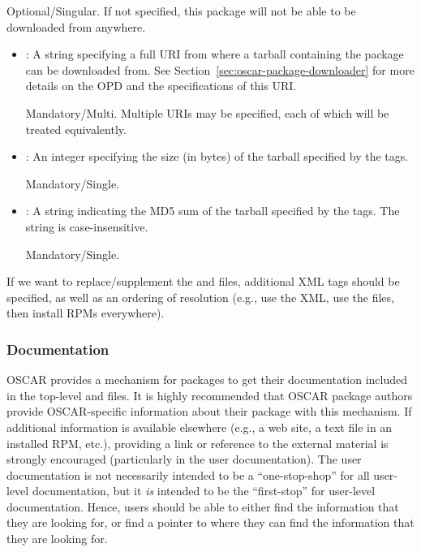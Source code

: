 \begin{itemize}
  Optional/Singular.  If not specified, this package will not be able
  to be downloaded from anywhere. 

  \begin{itemize}
  \item {}: A string specifying a full URI from where a
    tarball containing the package can be downloaded from.  See
    Section~\ref{sec:oscar-package-downloader} for more details on the
    OPD and the specifications of this URI.

    Mandatory/Multi.  Multiple URIs may be specified, each of which
    will be treated equivalently.  
    
  \item {}: An integer specifying the size (in bytes) of
    the tarball specified by the  tags.

    Mandatory/Single.
    
  \item {}: A string indicating the MD5 sum of the
    tarball specified by the  tags.  The string is
    case-insensitive. 
    
    Mandatory/Single.
  \end{itemize}
\end{itemize}

\begin{discuss}
  If we want to replace/supplement the  and
   files, additional XML tags should be
  specified, as well as an ordering of resolution (e.g., use the XML,
  use the files, then install RPMs everywhere).
\end{discuss}

\endchange


\subsubsection{Documentation}
\label{sec:design-pkg-docs}

OSCAR provides a mechanism for packages to get their documentation
included in the top-level  and 
files.  It is highly recommended that OSCAR package authors provide
OSCAR-specific information about their package with this mechanism.
If additional information is available elsewhere (e.g., a web site, a
text file in an installed RPM, etc.), providing a link or reference to
the external material is strongly encouraged (particularly in the user
documentation).  The user documentation is not necessarily intended to
be a ``one-stop-shop'' for all user-level documentation, but it {\em
  is} intended to be the ``first-stop'' for user-level documentation.
Hence, users should be able to either find the information that they
are looking for, or find a pointer to where they can find the
information that they are looking for.

